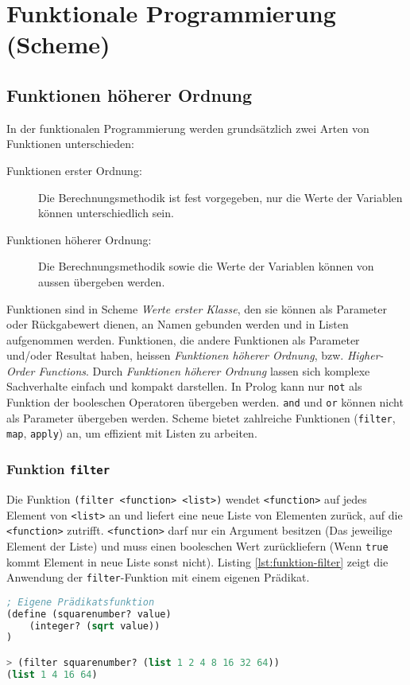 \chapter{Funktionale Programmierung (Scheme)}

\section{Funktionen höherer Ordnung}

In der funktionalen Programmierung werden grundsätzlich zwei Arten von Funktionen unterschieden:
\begin{description}
	\item[Funktionen erster Ordnung:] Die Berechnungsmethodik ist fest vorgegeben, nur die Werte der Variablen können unterschiedlich sein.
	\item[Funktionen höherer Ordnung:] Die Berechnungsmethodik sowie die Werte der Variablen können von aussen übergeben werden.
\end{description}
Funktionen sind in Scheme \textit{Werte erster Klasse}, den sie können als Parameter oder Rückgabewert dienen, an Namen gebunden werden und in Listen aufgenommen werden. Funktionen, die andere Funktionen als Parameter und/oder Resultat haben, heissen \textit{Funktionen höherer Ordnung}, bzw. \textit{Higher-Order Functions}. Durch \textit{Funktionen höherer Ordnung} lassen sich komplexe Sachverhalte einfach und kompakt darstellen. In Prolog kann nur \verb|not| als Funktion der booleschen Operatoren übergeben werden. \verb|and| und \verb|or| können nicht als Parameter übergeben werden. Scheme bietet zahlreiche Funktionen (\verb|filter|, \verb|map|, \verb|apply|) an, um effizient mit Listen zu arbeiten.

\subsection{Funktion \texttt{filter}}

Die Funktion \verb|(filter <function> <list>)| wendet \verb|<function>| auf jedes Element von  \verb|<list>| an und liefert eine neue Liste von Elementen zurück, auf die \verb|<function>| zutrifft. \verb|<function>| darf nur ein Argument besitzen (Das jeweilige Element der Liste) und muss einen booleschen Wert zurückliefern (Wenn \verb|true| kommt Element in neue Liste sonst nicht). Listing \ref{lst:funktion-filter} zeigt die Anwendung der \verb|filter|-Funktion mit einem eigenen Prädikat.

\begin{lstlisting}[language=Lisp, caption=Funktion filter, label=lst:funktion-filter]
; Eigene Prädikatsfunktion
(define (squarenumber? value)
	(integer? (sqrt value))
)

> (filter squarenumber? (list 1 2 4 8 16 32 64))
(list 1 4 16 64)
\end{lstlisting}

